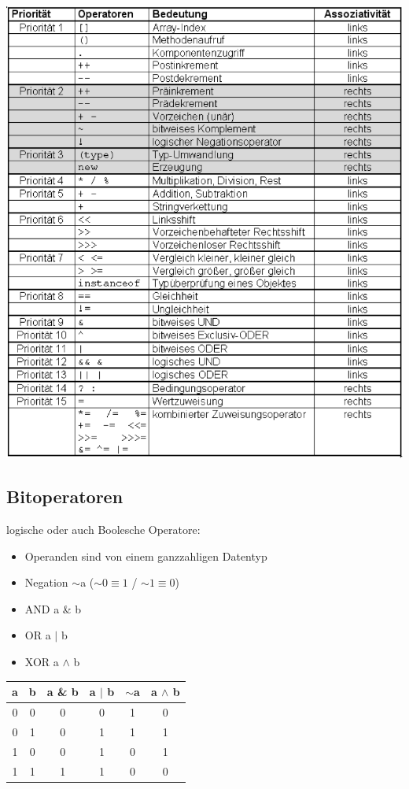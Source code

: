 \documentclass[a4paper,10pt]{article}
\begin{document}
\includegraphics[width=150mm]{operatoren_prios.png}

\subsection{Bitoperatoren}
logische oder auch Boolesche Operatore:
\begin{itemize}
	\item Operanden sind von einem ganzzahligen Datentyp
	\item Negation $\sim$a ($\sim 0 \equiv 1$ / $\sim 1\equiv 0$)
	\item AND a \& b
	\item OR a $|$ b
	\item XOR a $\wedge$  b
\end{itemize}
\begin{tabular}{|c|c|c|c|c|c|}
	\hline
	a & b & {a \& b} & a $|$ b & $\sim$a &  a $\wedge$  b \\
	\hline
	0 & 0 & 0 & 0 & 1 & 0 \\
	0 & 1 & 0 & 1 & 1 & 1 \\
	1 & 0 & 0 & 1 & 0 & 1 \\
	1 & 1 & 1 & 1 & 0 & 0 \\
	\hline
\end{tabular}
\end{document}

